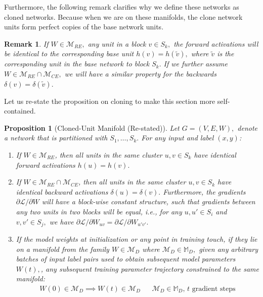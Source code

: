 \documentclass{article}
\newcommand{\Loss}{\mathcal{L}}
\newcommand{\ManifoldD}{\mathcal{M}_{D}}
\newcommand{\ManifoldRE}{\mathcal{M}_{RE}}
\newcommand{\ManifoldCE}{\mathcal{M}_{CE}}
\newtheorem{proposition}{Proposition}[section]
\newtheorem{remark}{Remark}[section]
\numberwithin{figure}{section}
\begin{document}
Furthermore, the following remark clarifies why we define these networks as cloned networks. Because when we are on these manifolds, the clone network units form perfect copies of the base network units. 

\begin{remark}
    If $W \in \ManifoldRE,$ any unit in a block $v \in S_k,$ the forward activations will be identical to the corresponding base unit $h(v) = h(\tilde{v}),$ where $\tilde{v}$ is the corresponding unit in the base network to block $S_k.$ If we further assume  $W \in \ManifoldRE\cap \ManifoldCE,$ we will have a similar property for the backwards $\delta (v) = \delta (\tilde{v}).$
\end{remark}

Let us re-state the proposition on cloning to make this section more self-contained. 

\begin{proposition}[Cloned-Unit Manifold (Re-stated)]
\label{prop:cloned_manifold_restated}
Let $G=(V,E,W),$ denote a network that is partitioned with $S_1,\dots, S_k. $ 
For any input and label $(x,y)$:

    \begin{enumerate}
        \item If $W \in \ManifoldRE$, then all units in the same cluster $u,v \in S_k$  have identical forward activations $h(u) = h(v).$
        \item If $W \in \ManifoldRE \cap \ManifoldCE$, then all units in the same cluster $u,v \in S_k$  have identical backward activations $\delta(u) = \delta(v).$ Furthermore, the gradients $\partial \Loss/\partial W$ will have a block-wise constant structure, such that gradients between any two units in two blocks will be equal, i.e., for any $u,u'\in S_i$ and $v,v'\in S_j,$ we have $\partial \Loss/\partial W_{uv} = \partial \Loss/\partial W_{u'v'}.$  
        \item If the model weights at initialization or any point in training touch, if they lie on a manifold from the family  $W\in \ManifoldD$ where $\ManifoldD \in \mathbb{M}_D,$ given any arbitrary batches of input label pairs used to obtain subsequent model parameters $W(t), $, any subsequent training parameter trajectory constrained to the same manifold:
    \begin{align*}
    W(0)\in \ManifoldD \implies    W(t) \in \ManifoldD && \text{$\ManifoldD\in \mathbb{M}_D$, $t$ gradient steps}
    \end{align*}
\end{enumerate}

\end{proposition}
\end{document}
